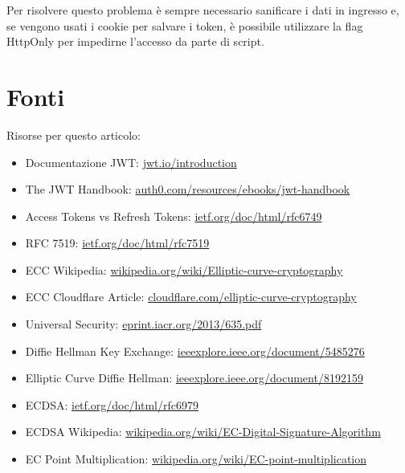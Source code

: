 \documentclass{article}
\begin{document}
Per risolvere questo problema è sempre necessario sanificare i dati in ingresso e, se vengono usati i cookie per salvare i token, è possibile utilizzare la flag HttpOnly per impedirne l'accesso da parte di script.


\section*{Fonti}
Risorse per questo articolo:

\begin{itemize}
	\item Documentazione JWT: \href{https://jwt.io/introduction}{jwt.io/introduction}
	\item The JWT Handbook: \href{https://auth0.com/resources/ebooks/jwt-handbook}{auth0.com/resources/ebooks/jwt-handbook}
	\item Access Tokens vs Refresh Tokens: \href{https://datatracker.ietf.org/doc/html/rfc6749#section-1.4}{ietf.org/doc/html/rfc6749}
	\item RFC 7519: \href{https://datatracker.ietf.org/doc/html/rfc7519}{ietf.org/doc/html/rfc7519}
	\item ECC Wikipedia: \href{https://en.wikipedia.org/wiki/Elliptic-curve_cryptography}{wikipedia.org/wiki/Elliptic-curve-cryptography}
	\item ECC Cloudflare Article: \href{https://blog.cloudflare.com/a-relatively-easy-to-understand-primer-on-elliptic-curve-cryptography/}{cloudflare.com/elliptic-curve-cryptography}
	\item Universal Security: \href{https://eprint.iacr.org/2013/635.pdf}{eprint.iacr.org/2013/635.pdf}
	\item Diffie Hellman Key Exchange: \href{https://ieeexplore.ieee.org/document/5485276}{ieeexplore.ieee.org/document/5485276}
	\item Elliptic Curve Diffie Hellman: \href{https://ieeexplore.ieee.org/document/8192159}{ieeexplore.ieee.org/document/8192159}
	\item ECDSA: \href{https://datatracker.ietf.org/doc/html/rfc6979}{ietf.org/doc/html/rfc6979}
	\item ECDSA Wikipedia: \href{https://en.wikipedia.org/wiki/Elliptic_Curve_Digital_Signature_Algorithm}{wikipedia.org/wiki/EC-Digital-Signature-Algorithm}
	\item EC Point Multiplication: \href{https://en.wikipedia.org/wiki/Elliptic_curve_point_multiplication}{wikipedia.org/wiki/EC-point-multiplication}
\end{itemize}
\end{document}
